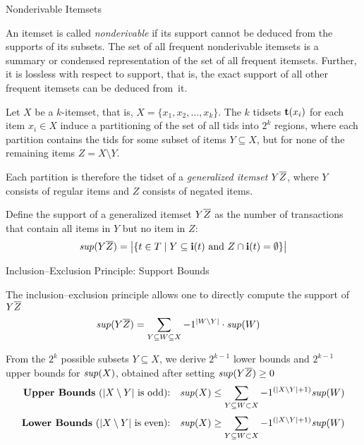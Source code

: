 \begin{frame}{Nonderivable Itemsets}
\small

An itemset is called {\em nonderivable} if its support cannot be deduced
from the supports of its subsets.  The set of all frequent nonderivable
itemsets is a summary or condensed representation of the set of all
frequent itemsets.  Further, it is lossless with respect to support,
that is, the exact support of all other frequent itemsets can be deduced
from~it.

 Let $X$ be a $k$-itemset, that is,
$X=\{x_1,x_2,\ldots,x_k\}$.  The $k$ tidsets  ${\mathbf{t}}(x_i)$ for each item
$x_i\in X$ induce a partitioning of the set of all tids into $2^k$
regions, where each partition contains the tids for some subset of items
$Y\subseteq X$, but for none of the remaining items $Z=X\setminus Y$. 

\medskip Each partition is therefore the tidset of a {\em generalized
itemset} $Y\overline{Z}$, where $Y$ consists of regular items and $Z$ consists
of negated items. 

\medskip
Def\/{i}ne the support of a generalized itemset $Y\overline{Z}$ as the number
of transactions that contain all items in $Y$ but no item in $Z$:
\begin{align*}
  \mathit{sup}(Y\overline{Z}) = \bigl| \{ t \in {\relax T} \mid Y \subseteq {\mathbf{i}}(t)
  \text{ and } Z \cap {\mathbf{i}}(t) = \emptyset\} \bigr|
\end{align*}
\end{frame}


\begin{frame}{Inclusion--Exclusion Principle: Support Bounds}

The inclusion--exclusion principle allows one to directly compute the
support of $Y\overline{Z}$
\begin{align*}
  \mathit{sup}(Y\overline{Z}) & = \sum_{Y \subseteq W \subseteq X}
  -1^{|W\setminus Y|}\cdot \mathit{sup}(W)
\end{align*}

\medskip
From the $2^k$
possible subsets $Y\subseteq X$, we derive $2^{k-1}$ lower bounds and
$2^{k-1}$ upper bounds  for $\mathit{sup}(X)$, obtained after
setting $\mathit{sup}(Y\overline{Z}) \ge 0$
\begin{align*}
\text{{\bf Upper Bounds} ($|X\setminus Y|$ is odd):} & &
\mathit{sup}(X) & \leq\sum_{Y \subseteq W \subset X} -1^{\left(|X\setminus
Y|+1\right)} \mathit{sup}(W)\\[2pt]
\text{{\bf Lower Bounds} ($|X\setminus Y|$ is even):} & &
\mathit{sup}(X) & \geq\sum_{Y \subseteq W \subset X} -1^{\left(|X\setminus
Y|+1\right)} \mathit{sup}(W)
\end{align*}
\end{frame}


